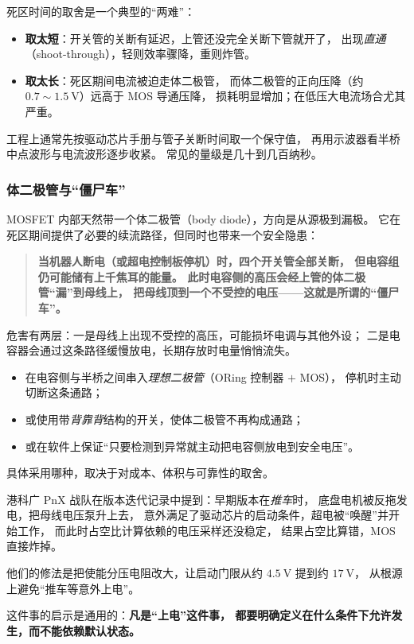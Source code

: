 \documentclass[cn,blue,11pt,device=normal]{elegantnote}
\begin{document}
死区时间的取舍是一个典型的“两难”：

\begin{itemize}
  \item \textbf{取太短}：开关管的关断有延迟，上管还没完全关断下管就开了，
  出现\emph{直通}（shoot-through），轻则效率骤降，重则炸管。
  \item \textbf{取太长}：死区期间电流被迫走体二极管，
  而体二极管的正向压降（约 $0.7\sim1.5\ \mathrm{V}$）远高于 MOS 导通压降，
  损耗明显增加；在低压大电流场合尤其严重。
\end{itemize}

工程上通常先按驱动芯片手册与管子关断时间取一个保守值，
再用示波器看半桥中点波形与电流波形逐步收紧。
常见的量级是几十到几百纳秒。

\subsubsection{体二极管与“僵尸车”}

MOSFET 内部天然带一个体二极管（body diode），方向是从源极到漏极。
它在死区期间提供了必要的续流路径，但同时也带来一个安全隐患：

\begin{quote}
\textbf{当机器人断电（或超电控制板停机）时，四个开关管全部关断，
但电容组仍可能储有上千焦耳的能量。
此时电容侧的高压会经上管的体二极管“漏”到母线上，
把母线顶到一个不受控的电压——这就是所谓的“僵尸车”。}
\end{quote}

危害有两层：一是母线上出现不受控的高压，可能损坏电调与其他外设；
二是电容器会通过这条路径缓慢放电，长期存放时电量悄悄流失。

\begin{note}[硬件上的常见对策]
\begin{itemize}
  \item 在电容侧与半桥之间串入\emph{理想二极管}（ORing 控制器 $+$ MOS），
  停机时主动切断这条通路；
  \item 或使用带\emph{背靠背}结构的开关，使体二极管不再构成通路；
  \item 或在软件上保证“只要检测到异常就主动把电容侧放电到安全电压”。
\end{itemize}
具体采用哪种，取决于对成本、体积与可靠性的取舍。
\end{note}

\begin{note}
港科广 PnX 战队在版本迭代记录中提到：早期版本在\emph{推车}时，
底盘电机被反拖发电，把母线电压泵升上去，
意外满足了驱动芯片的启动条件，超电被“唤醒”并开始工作，
而此时占空比计算依赖的电压采样还没稳定，
结果占空比算错，MOS 直接炸掉。

他们的修法是把使能分压电阻改大，让启动门限从约 $4.5\ \mathrm{V}$ 提到约 $17\ \mathrm{V}$，
从根源上避免“推车等意外上电”。

这件事的启示是通用的：\textbf{凡是“上电”这件事，
都要明确定义在什么条件下允许发生，而不能依赖默认状态。}
\end{note}
\end{document}
